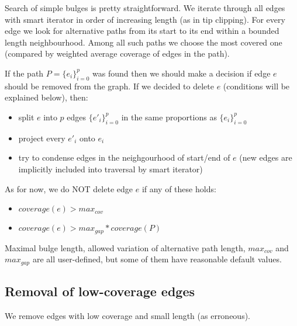 \documentclass[12pt]{article}
\begin{document}
Search of simple bulges is pretty straightforward.
We iterate through all edges with smart iterator in order of increasing length (as in tip clipping). For every edge we look for alternative paths from its start to its end within a bounded length neighbourhood.
Among all such paths we choose the most covered one (compared by weighted average coverage of edges in the path).  

If the path $P=\{e_i\}_{i=0}^{p}$ was found then we should make a decision if edge $e$ should be removed from the graph. If we decided to delete $e$ (conditions will be explained below), then:
\begin{itemize}
\item split $e$ into $p$ edges $\{e'_i\}_{i=0}^{p}$ in the same proportions as $\{e_i\}_{i=0}^{p}$
\item project every $e'_i$ onto $e_i$
\item try to condense edges in the neighgourhood of start/end of $e$ (new edges are implicitly included into traversal by smart iterator)
\end{itemize}

As for now, we do NOT delete edge $e$ if any of these holds:
\begin{itemize}
\item $coverage(e)>max_{cov}$
\item $coverage(e)>max_{gap}*coverage(P)$
\end{itemize}

Maximal bulge length, allowed variation of alternative path length, $max_{cov}$ and $max_{gap}$ are all user-defined, but some of them have reasonable default values.

\subsection{Removal of low-coverage edges}

We remove edges with low coverage and small length (as erroneous).
\end{document}
